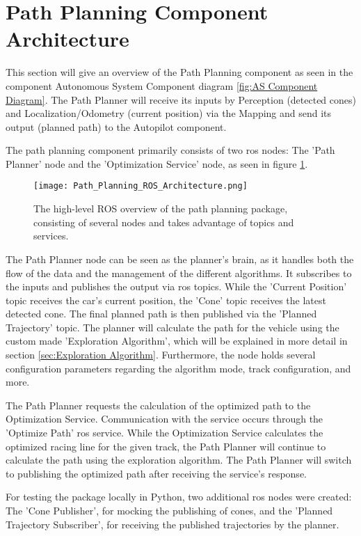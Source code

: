 \section{Path Planning Component Architecture} \label{sec:Path Planning Component Architecture}
This section will give an overview of the Path Planning component as seen in the component Autonomous System Component diagram \ref{fig:AS Component Diagram}. The Path Planner will receive its inputs by Perception (detected cones) and Localization/Odometry (current position) via the Mapping and send its output (planned path) to the Autopilot component.

The path planning component primarily consists of two \acrshort{ros} nodes: The 'Path Planner' node and the 'Optimization Service' node, as seen in figure \ref{fig:Path Planning ROS Architecture}.
\begin{figure}[H]
    \centering
    \texttt{[image: Path\_Planning\_ROS\_Architecture.png]}
    \caption{The high-level ROS overview of the path planning package, consisting of several nodes and takes advantage of topics and services.}
    \label{fig:Path Planning ROS Architecture}
\end{figure}

The Path Planner node can be seen as the planner's brain, as it handles both the flow of the data and the management of the different algorithms. It subscribes to the inputs and publishes the output via \acrshort{ros} topics. While the 'Current Position' topic receives the car's current position, the 'Cone' topic receives the latest detected cone. The final planned path is then published via the 'Planned Trajectory' topic. The planner will calculate the path for the vehicle using the custom made 'Exploration Algorithm', which will be explained in more detail in section \ref{sec:Exploration Algorithm}. Furthermore, the node holds several configuration parameters regarding the algorithm mode, track configuration, and more.

The Path Planner requests the calculation of the optimized path to the Optimization Service. Communication with the service occurs through the 'Optimize Path' \acrshort{ros} service. While the Optimization Service calculates the optimized racing line for the given track, the Path Planner will continue to calculate the path using the exploration algorithm. The Path Planner will switch to publishing the optimized path after receiving the service's response.

For testing the package locally in Python, two additional \acrshort{ros} nodes were created: The 'Cone Publisher', for mocking the publishing of cones, and the 'Planned Trajectory Subscriber', for receiving the published trajectories by the planner.

